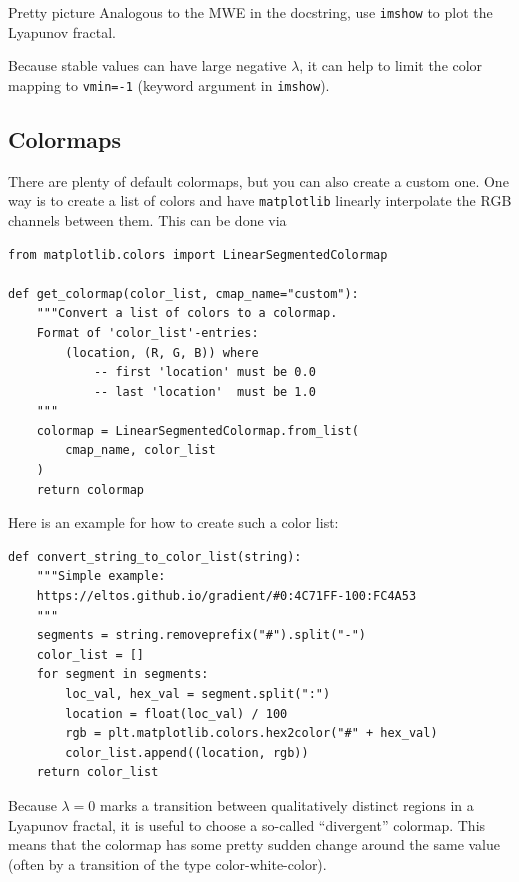 \documentclass[english,landscape]{article}
\begin{document}
\begin{minipage}[c]{0.4\pagewidth}
\begin{taskbox}{Pretty picture}
Analogous to the MWE in the docstring, use \texttt{imshow} to plot the Lyapunov fractal.

Because stable values can have large negative $\lambda$, it can help to limit the color mapping to \texttt{vmin=-1} (keyword argument in \texttt{imshow}).
\end{taskbox}
\subsection{Colormaps}
There are plenty of default colormaps, but you can also create a custom one.
One way is to create a list of colors and have \texttt{matplotlib} linearly interpolate the RGB channels between them.
This can be done via
\begin{verbatim}
from matplotlib.colors import LinearSegmentedColormap

def get_colormap(color_list, cmap_name="custom"):
    """Convert a list of colors to a colormap.
    Format of 'color_list'-entries:
        (location, (R, G, B)) where
            -- first 'location' must be 0.0
            -- last 'location'  must be 1.0
    """
    colormap = LinearSegmentedColormap.from_list(
        cmap_name, color_list
    )
    return colormap
\end{verbatim}
Here is an example for how to create such a color list:
\begin{verbatim}
def convert_string_to_color_list(string):
    """Simple example:
    https://eltos.github.io/gradient/#0:4C71FF-100:FC4A53
    """
    segments = string.removeprefix("#").split("-")
    color_list = []
    for segment in segments:
        loc_val, hex_val = segment.split(":")
        location = float(loc_val) / 100
        rgb = plt.matplotlib.colors.hex2color("#" + hex_val)
        color_list.append((location, rgb))
    return color_list
\end{verbatim}
Because $\lambda=0$ marks a transition between qualitatively distinct regions in a Lyapunov fractal, it is useful to choose a so-called \enquote{divergent} colormap.
This means that the colormap has some pretty sudden change around the same value (often by a transition of the type color-white-color).
\end{minipage}
\end{document}
